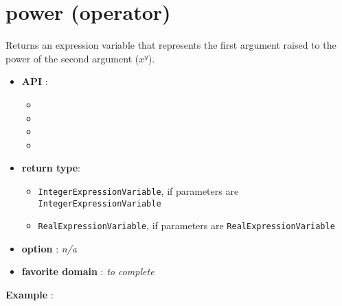 \label{power}
\hypertarget{power}{}

\section{power (operator)}\label{power:poweroperator}\hypertarget{power:poweroperator}{}
Returns an expression variable that represents the first argument raised to the power of the second argument (\(x^y\)).

\begin{itemize}
	\item \textbf{API} :
	\begin{itemize}
		\item {}
		\item {}
		\item {}
		\item {}
	\end{itemize}
	\item \textbf{return type}:
	\begin{itemize}
		\item \texttt{IntegerExpressionVariable}, if parameters are \texttt{IntegerExpressionVariable}
		\item \texttt{RealExpressionVariable}, if parameters are \texttt{RealExpressionVariable}
	\end{itemize}
	\item \textbf{option} : \emph{n/a}
	\item \textbf{favorite domain} : \emph{to complete}
\end{itemize}

\textbf{Example} : 

